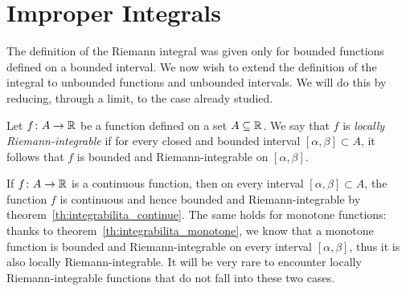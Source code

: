 \section{Improper Integrals}

The definition of the Riemann integral was given only for bounded functions
defined on a bounded interval. We now wish to extend the definition of the
integral to unbounded functions and unbounded intervals. We will do this by
reducing, through a limit, to the case already studied.

\begin{definition}
\label{def:localmente_riemann}
Let $f\colon A \to {\mathbb R}$ be a function defined on a set $A\subseteq {\mathbb R}$. We say
that $f$ is \emph{locally Riemann-integrable} if for every closed and bounded
interval $[\alpha,\beta]\subset A$, it follows that $f$ is bounded and
Riemann-integrable on $[\alpha,\beta]$.
\end{definition}

\begin{remark}
If $f\colon A \to {\mathbb R}$ is a continuous function, then on every interval
$[\alpha,\beta]\subset A$, the function $f$ is continuous and hence bounded and
Riemann-integrable by theorem~\ref{th:integrabilita_continue}. The same holds
for monotone functions: thanks to theorem~\ref{th:integrabilita_monotone}, we
know that a monotone function is bounded and Riemann-integrable on every
interval $[\alpha,\beta]$, thus it is also locally Riemann-integrable. It will
be very rare to encounter locally Riemann-integrable functions that do not fall
into these two cases.
\end{remark}

